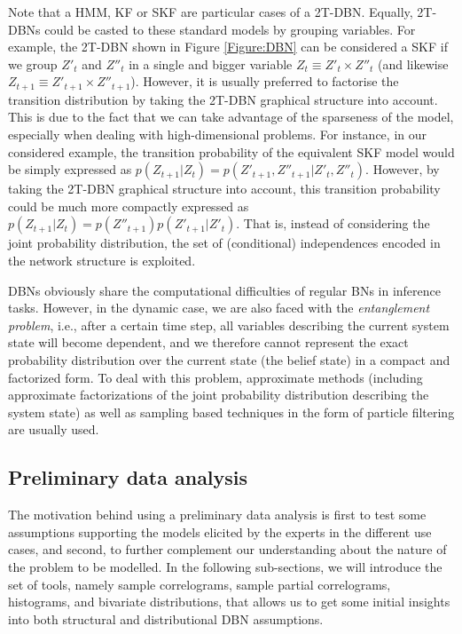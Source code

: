Note that a HMM, KF or SKF are particular cases of a 2T-DBN. Equally, 2T-DBNs could be casted to these standard models by grouping variables. For example, the 2T-DBN shown in Figure \ref{Figure:DBN} can be considered a SKF if we group $Z'_t$ and $Z''_t$ in a single and bigger variable $Z_t \equiv Z'_t \times Z''_t $ (and likewise $Z_{t+1} \equiv Z'_{t+1} \times Z''_{t+1} $). However, it is usually preferred to factorise the transition distribution by taking the 2T-DBN graphical structure into account. This is due to the fact that we can take advantage of the sparseness of the model, especially when dealing with high-dimensional problems. For instance, in our considered example, the transition probability of the equivalent SKF model would be simply expressed as $p(Z_{t+1}|Z_t) = p(Z'_{t+1},Z''_{t+1}|Z'_t,Z''_t) $. However, by taking the 2T-DBN graphical structure into account, this transition probability could be much more compactly expressed as $p(Z_{t+1}|Z_t)=p(Z''_{t+1})p(Z'_{t+1}|Z'_t)$. That is, instead of considering the joint probability distribution, the set of (conditional) independences encoded in the network structure is exploited.

DBNs obviously share the computational difficulties of regular BNs in inference tasks. However, in the dynamic case, we are also faced with the \textit{entanglement problem}, i.e., after a certain time step, all variables describing the current system state will become dependent, and we therefore cannot represent the exact probability distribution over the current state (the belief state) in a compact and factorized form. To deal with this problem, approximate methods (including approximate factorizations of the joint probability distribution describing the system state) \cite{BoyenKoller1998} as well as sampling based techniques in the form of particle filtering \cite{Doucet2000} are usually used.

\subsection{Preliminary data analysis}\label{SubSection:DataAnalysis}

The motivation behind using a preliminary data analysis is first to test some assumptions supporting the models elicited by the experts in the different use cases, and second, to further complement our understanding about the nature of the problem to be modelled. In the following sub-sections, we will introduce the set of tools, namely sample correlograms, sample partial correlograms, histograms, and bivariate distributions, that allows us to get some initial insights into both structural and distributional DBN assumptions.

